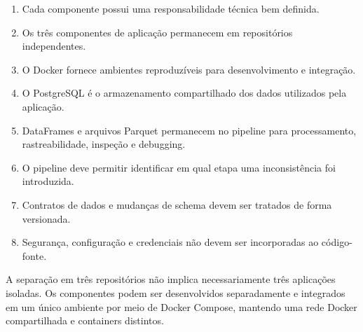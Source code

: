 \begin{enumerate}
    \item Cada componente possui uma responsabilidade técnica bem definida.
    \item Os três componentes de aplicação permanecem em repositórios independentes.
    \item O Docker fornece ambientes reproduzíveis para desenvolvimento e integração.
    \item O PostgreSQL é o armazenamento compartilhado dos dados utilizados pela aplicação.
    \item DataFrames e arquivos Parquet permanecem no pipeline para processamento, rastreabilidade, inspeção e debugging.
    \item O pipeline deve permitir identificar em qual etapa uma inconsistência foi introduzida.
    \item Contratos de dados e mudanças de schema devem ser tratados de forma versionada.
    \item Segurança, configuração e credenciais não devem ser incorporadas ao código-fonte.
\end{enumerate}

\begin{explicacao}
A separação em três repositórios não implica necessariamente três aplicações isoladas. Os componentes podem ser desenvolvidos separadamente e integrados em um único ambiente por meio de Docker Compose, mantendo uma rede Docker compartilhada e containers distintos.
\end{explicacao}
